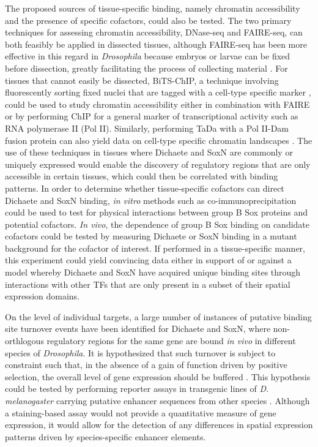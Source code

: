 The proposed sources of tissue-specific binding, namely chromatin accessibility and the presence of specific cofactors, could also be tested. The two primary techniques for assessing chromatin accessibility, DNase-seq and FAIRE-seq, can both feasibly be applied in dissected tissues, although FAIRE-seq has been more effective in this regard in \emph{Drosophila} because embryos or larvae can be fixed before dissection, greatly facilitating the process of collecting material \citep{mckay_common_2013}. For tissues that cannot easily be dissected, BiTS-ChIP, a technique involving fluorescently sorting fixed nuclei that are tagged with a cell-type specific marker \citep{bonn_tissue-specific_2012}, could be used to study chromatin accessibility either in combination with FAIRE or by performing ChIP for a general marker of transcriptional activity such as RNA polymerase II (Pol II). Similarly, performing TaDa with a Pol II-Dam fusion protein can also yield data on cell-type specific chromatin landscapes \citep{southall_cell-type-specific_2013}. The use of these techniques in tissues where Dichaete and SoxN are commonly or uniquely expressed would enable the discovery of regulatory regions that are only accessible in certain tissues, which could then be correlated with binding patterns. In order to determine whether tissue-specific cofactors can direct Dichaete and SoxN binding, \emph{in vitro} methods such as co-immunoprecipitation could be used to test for physical interactions between group B Sox proteins and potential cofactors. \emph{In vivo}, the dependence of group B Sox binding on candidate cofactors could be tested by measuring Dichaete or SoxN binding in a mutant background for the cofactor of interest. If performed in a tissue-specific manner, this experiment could yield convincing data either in support of or against a model whereby Dichaete and SoxN have acquired unique binding sites through interactions with other TFs that are only present in a subset of their spatial expression domains.

On the level of individual targets, a large number of instances of putative binding site turnover events have been identified for Dichaete and SoxN, where non-orthlogous regulatory regions for the same gene are bound \emph{in vivo} in different species of \emph{Drosophila}. It is hypothesized that such turnover is subject to constraint such that, in the absence of a gain of function driven by positive selection, the overall level of gene expression should be buffered \citep{he_does_2011,spivakov_analysis_2012}. This hypothesis could be tested by performing reporter assays in transgenic lines of \emph{D. melanogaster} carrying putative enhancer sequences from other species \citep{hare_sepsid_2008}. Although a staining-based assay would not provide a quantitative measure of gene expression, it would allow for the detection of any differences in spatial expression patterns driven by species-specific enhancer elements.

